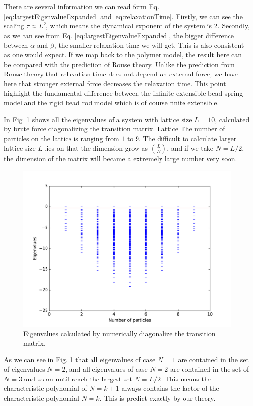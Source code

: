 \documentclass[12pt,a4paper]{article}
\begin{document}
There are several information we can read form Eq.
\eqref{eq:largestEigenvalueExpanded} and \eqref{eq:relaxationTime}. Firstly, we
can see the scaling $\tau \approx L^2$, which means the dynamical exponent of
the system is $2$. Secondly, as we can see from Eq.
\eqref{eq:largestEigenvalueExpanded}, the bigger difference between $\alpha$
and $\beta$, the smaller relaxation time we will get. This is also consistent
as one would expect. If we map back to the polymer model, the result here can
be compared with the prediction of Rouse theory. Unlike the prediction
from Rouse theory that relaxation time does not depend on external force, we
have here that stronger external force decreases the relaxation time. This
point highlight the fundamental difference between the infinite extensible bead
spring model and the rigid bead rod model which is of course finite extensible. 

In Fig.  \ref{fig:eigenvalues} shows all the eigenvalues of a system with
lattice size $L=10$, calculated by brute force diagonalizing the transition
matrix.  Lattice The number of particles on the lattice is ranging from $1$ to
$9$. The difficult to calculate larger lattice size $L$ lies on that the
dimension grow as $\binom{L}{N}$, and if we take $N=L/2$, the dimension of the
matrix will became a extremely large number very soon. 

\begin{figure}[htpb]
    \centering
    \includegraphics[width=0.8\linewidth]{eigenvalues}
    \caption{Eigenvalues calculated by numerically diagonalize the transition
        matrix.}
    \label{fig:eigenvalues}
\end{figure}

As we can see in Fig. \ref{fig:eigenvalues}
that all eigenvalues of case $N=1$ are contained in the set of
eigenvalues $N=2$, and all eigenvalues of case $N=2$ are contained in the set
of $N=3$ and so on until reach the largest set $N=L/2$. This means the
characteristic polynomial of $N=k+1$ always contains the factor of the
characteristic polynomial $N=k$. This is predict exactly by our theory. 
\end{document}
